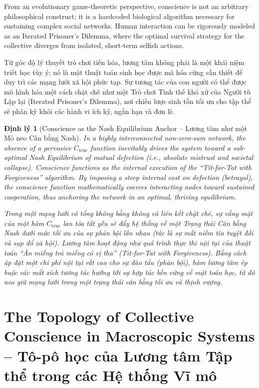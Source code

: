 \documentclass{report}
\newtheorem{dinhly}{Định lý}
\begin{document}
From an evolutionary game-theoretic perspective, conscience is not an arbitrary philosophical construct; it is a hardcoded biological algorithm necessary for sustaining complex social networks. Human interaction can be rigorously modeled as an Iterated Prisoner's Dilemma, where the optimal survival strategy for the collective diverges from isolated, short-term selfish actions.

Từ góc độ lý thuyết trò chơi tiến hóa, lương tâm không phải là một khái niệm triết học tùy ý; nó là một thuật toán sinh học được mã hóa cứng cần thiết để duy trì các mạng lưới xã hội phức tạp. Sự tương tác của con người có thể được mô hình hóa một cách chặt chẽ như một Trò chơi Tình thế khó xử của Người tù Lặp lại (Iterated Prisoner's Dilemma), nơi chiến lược sinh tồn tối ưu cho tập thể sẽ phân kỳ khỏi các hành vi ích kỷ, ngắn hạn và đơn lẻ.

\begin{dinhly}[Conscience as the Nash Equilibrium Anchor -- Lương tâm như một Mỏ neo Cân bằng Nash]
	In a highly interconnected non-zero-sum network, the absence of a pervasive $C_{\text{true}}$ function inevitably drives the system toward a sub-optimal Nash Equilibrium of mutual defection (i.e., absolute mistrust and societal collapse). Conscience functions as the internal execution of the ``Tit-for-Tat with Forgiveness'' algorithm. By imposing a steep internal cost on defection (betrayal), the conscience function mathematically coerces interacting nodes toward sustained cooperation, thus anchoring the network in an optimal, thriving equilibrium.
	
	Trong một mạng lưới có tổng không bằng không và liên kết chặt chẽ, sự vắng mặt của một hàm $C_{\text{true}}$ lan tỏa tất yếu sẽ đẩy hệ thống về một Trạng thái Cân bằng Nash dưới mức tối ưu của sự phản bội lẫn nhau (tức là sự mất niềm tin tuyệt đối và sụp đổ xã hội). Lương tâm hoạt động như quá trình thực thi nội tại của thuật toán ``Ăn miếng trả miếng có vị tha'' (Tit-for-Tat with Forgiveness). Bằng cách áp đặt một chi phí nội tại rất cao cho sự đào tẩu (phản bội), hàm lương tâm ép buộc các mắt xích tương tác hướng tới sự hợp tác bền vững về mặt toán học, từ đó neo giữ mạng lưới trong một trạng thái cân bằng tối ưu và thịnh vượng.
\end{dinhly}

\section{The Topology of Collective Conscience in Macroscopic Systems -- Tô-pô học của Lương tâm Tập thể trong các Hệ thống Vĩ mô}
\end{document}
